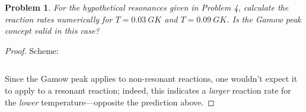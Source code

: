\documentclass{article}
\newtheorem{plm}{Problem}
\begin{document}
\begin{plm}
  For the hypothetical resonances given in Problem 4, calculate the reaction rates numerically for $T = \SI{0.03}{GK}$
  and $T = \SI{0.09}{GK}$.
  Is the Gamow peak concept valid in this case?
\end{plm}

\begin{proof}
  Scheme:
  \inputminted{scheme}{calc.scm}
  Since the Gamow peak applies to non-resonant reactions, one wouldn't expect it to apply to a resonant reaction;
  indeed, this indicates a \textit{larger} reaction rate for the \textit{lower} temperature---opposite the prediction above.
\end{proof}
\end{document}
